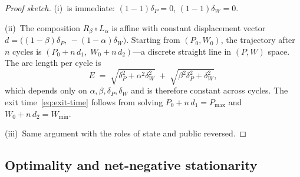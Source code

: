 \documentclass[11pt,a4paper]{article}
\theoremstyle{definition}
\theoremstyle{remark}
\begin{document}
\begin{proof}[Proof sketch]
(i)~is immediate: $(1-1)\delta_P = 0$, $(1-1)\delta_W = 0$.

\smallskip\noindent
(ii)~The composition $R_\beta \circ L_\alpha$ is affine with
constant displacement vector
$d = \bigl((1-\beta)\delta_P,\, -(1-\alpha)\delta_W\bigr)$.
Starting from $(P_0, W_0)$, the trajectory after $n$ cycles is
$(P_0 + n\,d_1,\; W_0 + n\,d_2)$---a discrete straight line in
$(P,W)$ space.
The arc length per cycle is
\[
  E \;=\;
  \sqrt{\delta_P^2 + \alpha^2\delta_W^2}
  \;+\;
  \sqrt{\beta^2\delta_P^2 + \delta_W^2},
\]
which depends only on $\alpha, \beta, \delta_P, \delta_W$ and is
therefore constant across cycles.
The exit time~\eqref{eq:exit-time} follows from solving
$P_0 + n\,d_1 = P_{\max}$ and $W_0 + n\,d_2 = W_{\min}$.

\smallskip\noindent
(iii)~Same argument with the roles of state and public reversed.
\end{proof}

\subsection*{Optimality and net-negative stationarity}
\end{document}
